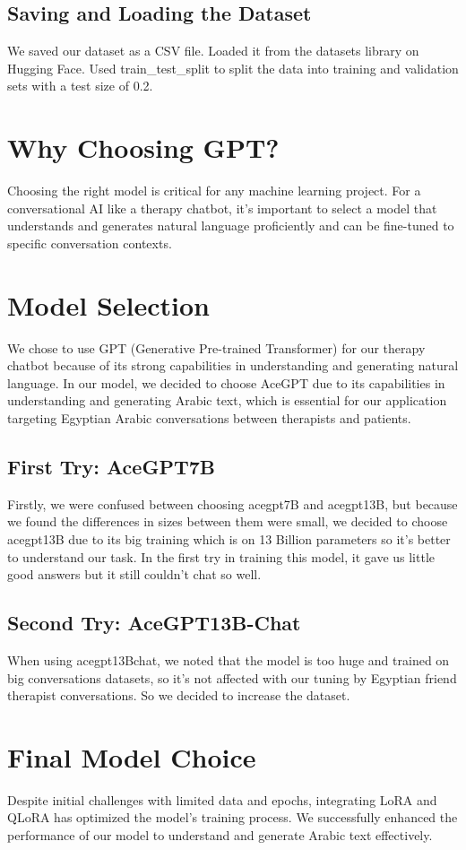 \subsection{Saving and Loading the Dataset}
We saved our dataset as a CSV file. Loaded it from the datasets library on Hugging Face. Used {train\_test\_split} to split the data into training and validation sets with a test size of 0.2.

\section{Why Choosing GPT?}
Choosing the right model is critical for any machine learning project. For a conversational AI like a therapy chatbot, it's important to select a model that understands and generates natural language proficiently and can be fine-tuned to specific conversation contexts.

\section{Model Selection}
We chose to use GPT (Generative Pre-trained Transformer) for our therapy chatbot because of its strong capabilities in understanding and generating natural language. In our model, we decided to choose AceGPT due to its capabilities in understanding and generating Arabic text, which is essential for our application targeting Egyptian Arabic conversations between therapists and patients.

\subsection{First Try: AceGPT7B}
Firstly, we were confused between choosing acegpt7B and acegpt13B, but because we found the differences in sizes between them were small, we decided to choose acegpt13B due to its big training which is on 13 Billion parameters so it’s better to understand our task. In the first try in training this model, it gave us little good answers but it still couldn't chat so well.

\subsection{Second Try: AceGPT13B-Chat}
When using acegpt13Bchat, we noted that the model is too huge and trained on big conversations datasets, so it’s not affected with our tuning by Egyptian friend therapist conversations. So we decided to increase the dataset.

\section{Final Model Choice}
Despite initial challenges with limited data and epochs, integrating LoRA and QLoRA has optimized the model's training process. We successfully enhanced the performance of our model to understand and generate Arabic text effectively.
